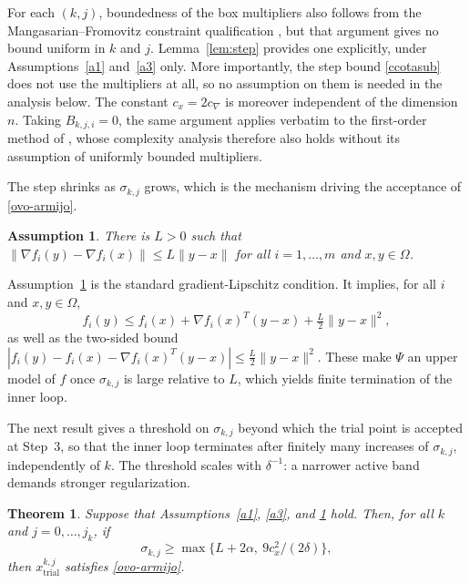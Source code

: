 \documentclass[11pt]{article}
\newcommand{\xkjtrial}{x^{k,j}_{\mathrm{trial}}}
\newtheorem{theorem}{Theorem}[section]
\newtheorem{assumption}{Assumption}
\begin{document}
For each $(k,j)$, boundedness of the box multipliers also follows from the
Mangasarian--Fromovitz constraint qualification \cite{gauvin}, but that argument
gives no bound uniform in $k$ and $j$. Lemma~\ref{lem:step} provides one
explicitly, under Assumptions~\ref{a1} and~\ref{a3} only. More importantly, the
step bound \eqref{ccotasub} does not use the multipliers at all, so no
assumption on them is needed in the analysis below. The constant $c_x = 2c_\nabla$
is moreover independent of the dimension $n$. Taking $B_{k,j,i} = 0$, the same
argument applies verbatim to the first-order method of \cite{alvarezovo}, whose
complexity analysis therefore also holds without its assumption of uniformly
bounded multipliers.

The step shrinks as $\sigma_{k,j}$ grows, which is the mechanism driving the
acceptance of \eqref{ovo-armijo}.

\begin{assumption} \label{a4}
There is $L > 0$ such that $\|\nabla f_i(y) - \nabla f_i(x)\| \leq L \|y - x\|$
for all $i = 1, \ldots, m$ and $x, y \in \Omega$.
\end{assumption}

Assumption~\ref{a4} is the standard gradient-Lipschitz condition. It implies,
for all $i$ and $x, y \in \Omega$,
\begin{equation} \label{taylor}
f_i(y) \leq f_i(x) + \nabla f_i(x)^T(y - x) + \tfrac{L}{2}\|y - x\|^2,
\end{equation}
as well as the two-sided bound
$|f_i(y) - f_i(x) - \nabla f_i(x)^T(y - x)| \leq \tfrac{L}{2}\|y - x\|^2$. These
make $\Psi$ an upper model of $f$ once $\sigma_{k,j}$ is large relative to $L$,
which yields finite termination of the inner loop. 

The next result gives a threshold on $\sigma_{k,j}$ beyond which the trial point
is accepted at Step~3, so that the inner loop terminates after finitely many
increases of $\sigma_{k,j}$, independently of $k$. The threshold scales with
$\delta^{-1}$: a narrower active band demands stronger regularization.

\begin{theorem} \label{teo:suff-descent}
Suppose that Assumptions~\ref{a1}, \ref{a3}, and \ref{a4} hold. Then,
for all $k$ and $j = 0, \ldots, j_k$, if
\begin{equation} \label{este}
\sigma_{k,j} \geq \max\{ L + 2\alpha,\ 9c_x^2/(2\delta) \},
\end{equation}
then $\xkjtrial$ satisfies \eqref{ovo-armijo}.
\end{theorem}
\end{document}
